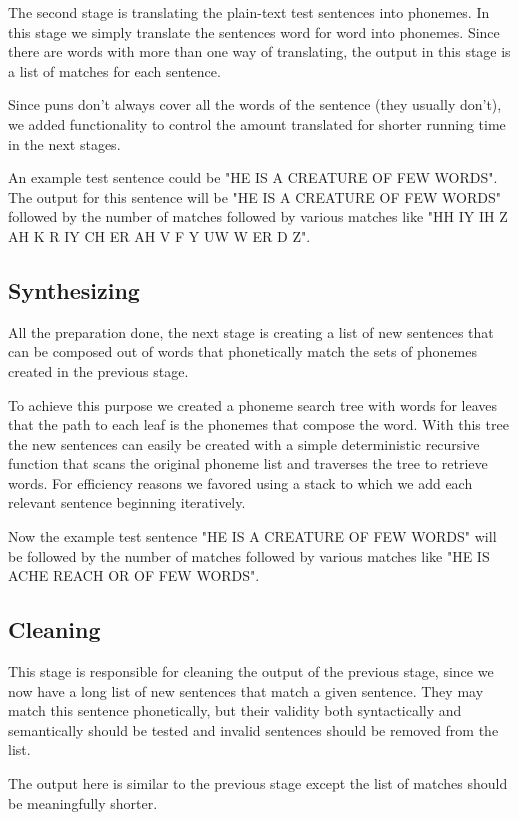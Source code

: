 \documentclass[11pt,a4paper]{article}
\begin{document}
The second stage is translating the plain-text test sentences into phonemes. In this stage we simply translate the sentences word for word into phonemes. Since there are words with more than one way of translating, the output in this stage is a list of matches for each sentence.

Since puns don't always cover all the words of the sentence (they usually don't), we added functionality to control the amount translated for shorter running time in the next stages. 

An example test sentence could be "HE IS A CREATURE OF FEW WORDS". The output for this sentence will be "HE IS A CREATURE OF FEW WORDS" followed by the number of matches followed by various matches like "HH IY IH Z AH K R IY CH ER AH V F Y UW W ER D Z".

\subsection{Synthesizing}

All the preparation done, the next stage is creating a list of new sentences that can be composed out of words that phonetically match the sets of phonemes created in the previous stage. 

To achieve this purpose we created a phoneme search tree with words for leaves that the path to each leaf is the phonemes that compose the word. With this tree the new sentences can easily be created with a simple deterministic recursive function that scans the original phoneme list and traverses the tree to retrieve words. For efficiency reasons we favored using a stack to which we add each relevant sentence beginning iteratively.

Now the example test sentence "HE IS A CREATURE OF FEW WORDS" will be followed by the number of matches followed by various matches like "HE IS ACHE REACH OR OF FEW WORDS".

\subsection{Cleaning}

This stage is responsible for cleaning the output of the previous stage, since we now have a long list of new sentences that match a given sentence. They may match this sentence phonetically, but their validity both syntactically and semantically should be tested and invalid sentences should be removed from the list. 

The output here is similar to the previous stage except the list of matches should be meaningfully shorter.
\end{document}
